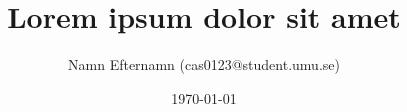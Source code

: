 \title{Lorem ipsum dolor sit amet}
\author{Namn Efternamn (cas0123@student.umu.se)}
\date{\today}

\begin{titlepage}
	\maketitle
	\thispagestyle{fancy}
	\rhead{\today}
\end{titlepage}

